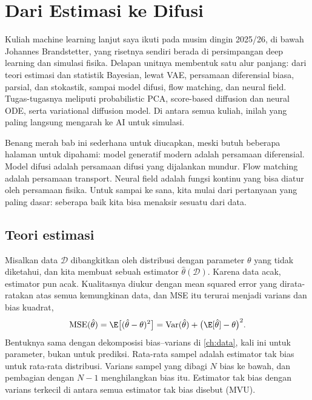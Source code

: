 \chapter{Dari Estimasi ke Difusi}
\label{ch:mlat}

Kuliah machine learning lanjut saya ikuti pada musim dingin 2025/26, di bawah Johannes
Brandstetter, yang risetnya sendiri berada di persimpangan deep learning dan simulasi fisika.
Delapan unitnya membentuk satu alur panjang: dari teori estimasi dan statistik Bayesian, lewat
VAE, persamaan diferensial biasa, parsial, dan stokastik, sampai model difusi, flow matching, dan
neural field. Tugas-tugasnya meliputi probabilistic PCA, score-based diffusion dan neural ODE, serta
variational diffusion model. Di antara semua kuliah, inilah yang paling langsung mengarah ke AI
untuk simulasi.

Benang merah bab ini sederhana untuk diucapkan, meski butuh beberapa halaman untuk dipahami:
model generatif modern adalah persamaan diferensial. Model difusi adalah persamaan difusi yang
dijalankan mundur. Flow matching adalah persamaan transport. Neural field adalah fungsi kontinu
yang bisa diatur oleh persamaan fisika. Untuk sampai ke sana, kita mulai dari pertanyaan yang
paling dasar: seberapa baik kita bisa menaksir sesuatu dari data.

\section{Teori estimasi}

Misalkan data $\mathcal D$ dibangkitkan oleh distribusi dengan parameter $\theta$ yang tidak
diketahui, dan kita membuat sebuah estimator $\hat\theta(\mathcal D)$. Karena data acak, estimator
pun acak. Kualitasnya diukur dengan mean squared error yang dirata-ratakan atas semua kemungkinan
data, dan MSE itu terurai menjadi varians dan bias kuadrat,
\begin{equation}
\mathrm{MSE}(\hat\theta)=\E\big[(\hat\theta-\theta)^2\big]=\mathrm{Var}(\hat\theta)+\big(\E[\hat\theta]-\theta\big)^2.
\end{equation}
Bentuknya sama dengan dekomposisi bias--varians di \cref{ch:data}, kali ini untuk parameter,
bukan untuk prediksi. Rata-rata sampel adalah estimator tak bias untuk rata-rata distribusi.
Varians sampel yang dibagi $N$ bias ke bawah, dan pembagian dengan $N-1$ menghilangkan bias itu.
Estimator tak bias dengan varians terkecil di antara semua estimator tak bias disebut
 (MVU).

